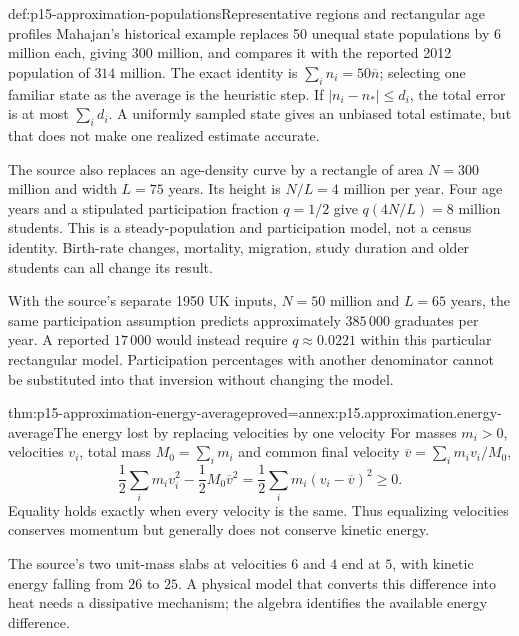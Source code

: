 \begin{hbexample}{def:p15-approximation-populations}{Representative regions and rectangular age profiles}
Mahajan's historical example replaces 50 unequal state populations by
\(6\) million each, giving \(300\) million, and compares it with the
reported 2012 population of \(314\) million. The exact identity is
\(\sum_i n_i=50\overline n\); selecting one familiar state as the average
is the heuristic step. If \(|n_i-n_*|\leq d_i\), the total error is at most
\(\sum_i d_i\). A uniformly sampled state gives an unbiased total estimate,
but that does not make one realized estimate accurate.

The source also replaces an age-density curve by a rectangle of area
\(N=300\) million and width \(L=75\) years. Its height is
\(N/L=4\) million per year. Four age years and a stipulated participation
fraction \(q=1/2\) give \(q(4N/L)=8\) million students. This is a
steady-population and participation model, not a census identity. Birth-rate
changes, mortality, migration, study duration and older students can all
change its result.

With the source's separate 1950 UK inputs, \(N=50\) million and \(L=65\)
years, the same participation assumption predicts approximately
\(385\,000\) graduates per year. A reported \(17\,000\) would instead
require \(q\approx0.0221\) within this particular rectangular model.
Participation percentages with another denominator cannot be substituted
into that inversion without changing the model.
\end{hbexample}

\begin{hbtheorem}{thm:p15-approximation-energy-average}{proved=annex:p15.approximation.energy-average}{The energy lost by replacing velocities by one velocity}
For masses \(m_i>0\), velocities \(v_i\), total mass \(M_0=\sum_i m_i\)
and common final velocity \(\overline v=\sum_i m_iv_i/M_0\),
\[
 \frac12\sum_i m_iv_i^2-\frac12M_0\overline v^2
 =\frac12\sum_i m_i(v_i-\overline v)^2\geq0.
\]
Equality holds exactly when every velocity is the same. Thus equalizing
velocities conserves momentum but generally does not conserve kinetic energy.
\end{hbtheorem}

The source's two unit-mass slabs at velocities \(6\) and \(4\) end at
\(5\), with kinetic energy falling from \(26\) to \(25\). A physical model
that converts this difference into heat needs a dissipative mechanism; the
algebra identifies the available energy difference.

